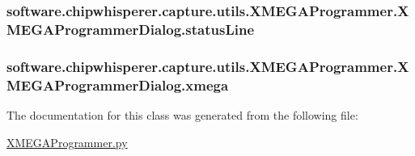 \subsubsection[{status\+Line}]{\setlength{\rightskip}{0pt plus 5cm}software.\+chipwhisperer.\+capture.\+utils.\+X\+M\+E\+G\+A\+Programmer.\+X\+M\+E\+G\+A\+Programmer\+Dialog.\+status\+Line}\label{classsoftware_1_1chipwhisperer_1_1capture_1_1utils_1_1XMEGAProgrammer_1_1XMEGAProgrammerDialog_a52f09c61f462d515059bf149cc7600be}
\hypertarget{classsoftware_1_1chipwhisperer_1_1capture_1_1utils_1_1XMEGAProgrammer_1_1XMEGAProgrammerDialog_a7d77907b27fbf5c33fa1b65ffb844ebb}{}
\subsubsection[{xmega}]{\setlength{\rightskip}{0pt plus 5cm}software.\+chipwhisperer.\+capture.\+utils.\+X\+M\+E\+G\+A\+Programmer.\+X\+M\+E\+G\+A\+Programmer\+Dialog.\+xmega}\label{classsoftware_1_1chipwhisperer_1_1capture_1_1utils_1_1XMEGAProgrammer_1_1XMEGAProgrammerDialog_a7d77907b27fbf5c33fa1b65ffb844ebb}


The documentation for this class was generated from the following file\+:\begin{DoxyCompactItemize}
\item 
\hyperlink{XMEGAProgrammer_8py}{X\+M\+E\+G\+A\+Programmer.\+py}\end{DoxyCompactItemize}

